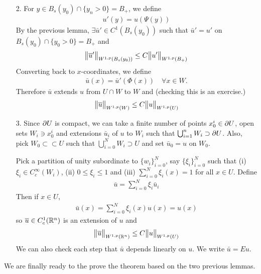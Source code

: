 \documentclass[10pt,a4paper]{report}
\newenvironment{proof}
{\begin{changemargin}{1cm}{0.5cm} 
	}%
	{\end{changemargin}
}
\begin{document}
\begin{proof}
\begin{itemize}
\item[2.] For $y\in B_s(y_0) \cap \{y_n >0 \} = B_+$, we define
\begin{align*}
u'(y) = u(\Psi(y))
\end{align*}
By the previous lemma, $\exists \bar{u}' \in C^1 (B_s(y_0))$ such that $\bar{u}' = u'$ on $B_s(y_0) \cap \{y_0 >0\} = B_+$ and
\begin{align*}
\bigl\lVert\overline{u}'\bigr\rVert_{W^{1,p}(B_s(y_0))} \leq C \bigl\lVert u'\bigr\rVert_{W^{1,p}(B_+)}
\end{align*}
Converting back to $x$-coordinates, we define
\begin{align*}
\bar{u}(x) = \bar{u}' (\Phi(x)) \quad \forall x\in W. 
\end{align*}
Therefore $\bar{u}$ extends $u$ from $U\cap W$ to $W$ and (checking this is an exercise.)
\begin{align*}
\bigl\lVert\overline{u}\bigr\rVert_{W^{1,p}(W)} \leq C\bigl\lVert u\bigr\rVert_{W^{1,p}(U)}
\end{align*}
\item[3.] Since $\partial U$ is compact, we can take a finite number of points $x^i_0 \in \partial U$, open sets $W_i \ni x_0^i$ and extensions $\bar{u}_i$ of $u$ to $W_i$ such that $\bigcup_{i=1}^n W_i \supset \partial U$. Also, pick $W_0 \subset \subset U$ such that $\bigcup_{i=0}^N W_i \supset U$ and set $\bar{u}_0 =u$ on $W_0$.

\quad Pick a partition of unity subordinate to $\{w_i\}_{i=0}^N$, say $\{\xi_i \}_{i=0}^N$ such that (i) $\xi_i \in C_c^{\infty}(W_i)$, (ii) $0\leq \xi_i \leq 1$ and (iii) $\sum_{i=0}^N \xi_i(x) =1$ for all $x\in U$. Define
\begin{align*}
\bar{u} = \sum_{i=0}^N \xi_i \bar{u}_i
\end{align*}
Then if $x\in U$,
\begin{align*}
\bar{u}(x) = \sum_{i=0}^N \xi_i(x) u(x) = u(x)
\end{align*}
so $\overline{u} \in C_c^1(\mathbb{R}^n)$ is an extension of $u$ and
\begin{align*}
\bigl\lVert\overline{u}\bigr\rVert_{W^{1,p}(\mathbb{R}^n)} \leq C \bigl\lVert u\bigr\rVert_{W^{1,p}(U)}
\end{align*}
We can also check each step that $\bar{u}$ depends linearly on $u$. We write $\bar{u} = Eu$. 
\end{itemize}

\eop
\end{proof}
\s

We are finally ready to the prove the theorem based on the two previous lemmas.
\s
\end{document}

